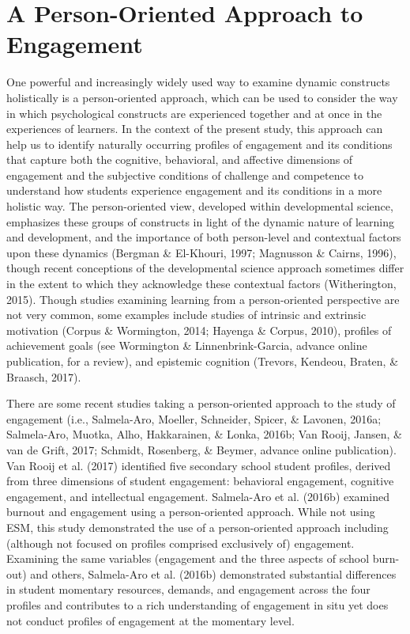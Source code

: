 \documentclass[]{book}
\theoremstyle{definition}
\theoremstyle{definition}
\theoremstyle{definition}
\theoremstyle{remark}
\begin{document}
\section{A Person-Oriented Approach to
Engagement}\label{a-person-oriented-approach-to-engagement}

One powerful and increasingly widely used way to examine dynamic
constructs holistically is a person-oriented approach, which can be used
to consider the way in which psychological constructs are experienced
together and at once in the experiences of learners. In the context of
the present study, this approach can help us to identify naturally
occurring profiles of engagement and its conditions that capture both
the cognitive, behavioral, and affective dimensions of engagement and
the subjective conditions of challenge and competence to understand how
students experience engagement and its conditions in a more holistic
way. The person-oriented view, developed within developmental science,
emphasizes these groups of constructs in light of the dynamic nature of
learning and development, and the importance of both person-level and
contextual factors upon these dynamics (Bergman \& El-Khouri, 1997;
Magnusson \& Cairns, 1996), though recent conceptions of the
developmental science approach sometimes differ in the extent to which
they acknowledge these contextual factors (Witherington, 2015). Though
studies examining learning from a person-oriented perspective are not
very common, some examples include studies of intrinsic and extrinsic
motivation (Corpus \& Wormington, 2014; Hayenga \& Corpus, 2010),
profiles of achievement goals (see Wormington \& Linnenbrink-Garcia,
advance online publication, for a review), and epistemic cognition
(Trevors, Kendeou, Braten, \& Braasch, 2017).

There are some recent studies taking a person-oriented approach to the
study of engagement (i.e., Salmela-Aro, Moeller, Schneider, Spicer, \&
Lavonen, 2016a; Salmela-Aro, Muotka, Alho, Hakkarainen, \& Lonka, 2016b;
Van Rooij, Jansen, \& van de Grift, 2017; Schmidt, Rosenberg, \& Beymer,
advance online publication). Van Rooij et al. (2017) identified five
secondary school student profiles, derived from three dimensions of
student engagement: behavioral engagement, cognitive engagement, and
intellectual engagement. Salmela-Aro et al. (2016b) examined burnout and
engagement using a person-oriented approach. While not using ESM, this
study demonstrated the use of a person-oriented approach including
(although not focused on profiles comprised exclusively of) engagement.
Examining the same variables (engagement and the three aspects of school
burn-out) and others, Salmela-Aro et al. (2016b) demonstrated
substantial differences in student momentary resources, demands, and
engagement across the four profiles and contributes to a rich
understanding of engagement in situ yet does not conduct profiles of
engagement at the momentary level.
\end{document}
